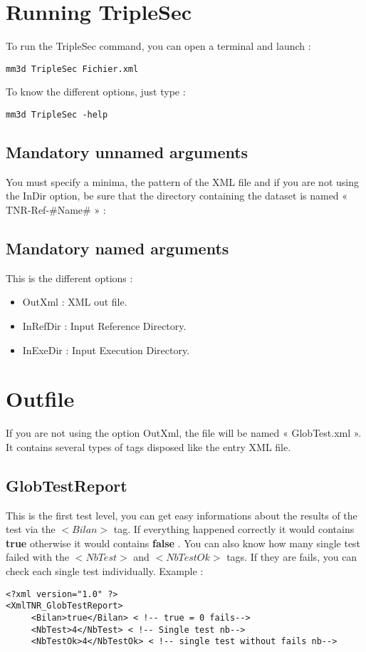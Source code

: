 \documentclass[a4paper]{book}
\begin{document}
\section{Running TripleSec}
To run the TripleSec command, you can open a terminal and launch :
\begin{verbatim}
mm3d TripleSec Fichier.xml
\end{verbatim}
To know the different options, just type :
\begin{verbatim}
mm3d TripleSec -help
\end{verbatim}

\subsection{Mandatory unnamed arguments}
You must specify a minima, the pattern of the XML file and if you are not using the InDir option, be sure that the directory containing the dataset is named « TNR-Ref-\#Name\# » :

\subsection{Mandatory named arguments}
This is the different options :
\begin{itemize}
\item OutXml : XML out file.
\item InRefDir : Input Reference Directory.
\item InExeDir : Input Execution Directory.
\end{itemize}

\section{Outfile}
If you are not using the option OutXml, the file will be named « GlobTest.xml ». It contains several types of tags disposed like the entry XML file.

\subsection{GlobTestReport}
This is the first test level, you can get easy informations about the results of the test via the $<Bilan>$ tag. If everything happened correctly it would contains \textbf{true} otherwise it would contains \textbf{false} .
You can also know how many single test failed with the $<NbTest>$ and $<NbTestOk>$ tags. If they are fails, you can check each single test individually.
Example :
\begin{lstlisting}
<?xml version="1.0" ?>
<XmlTNR_GlobTestReport>
     <Bilan>true</Bilan> < !-- true = 0 fails-->
     <NbTest>4</NbTest> < !-- Single test nb-->
     <NbTestOk>4</NbTestOk> < !-- single test without fails nb-->
\end{lstlisting}
\end{document}
